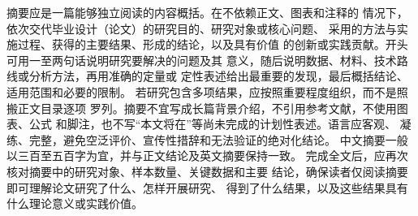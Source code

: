 \documentclass{swutthesis}
\begin{document}
\maketitle
\makecopyrightstatements

\begin{cnabstract}
摘要应是一篇能够独立阅读的内容概括。在不依赖正文、图表和注释的
情况下，依次交代毕业设计（论文）的研究目的、研究对象或核心问题、
采用的方法与实施过程、获得的主要结果、形成的结论，以及具有价值
的创新或实践贡献。开头可用一至两句话说明研究要解决的问题及其
意义，随后说明数据、材料、技术路线或分析方法，再用准确的定量或
定性表述给出最重要的发现，最后概括结论、适用范围和必要的限制。
若研究包含多项结果，应按照重要程度组织，而不是照搬正文目录逐项
罗列。摘要不宜写成长篇背景介绍，不引用参考文献，不使用图表、公式
和脚注，也不写“本文将在”等尚未完成的计划性表述。语言应客观、
凝练、完整，避免空泛评价、宣传性措辞和无法验证的绝对化结论。
中文摘要一般以三百至五百字为宜，并与正文结论及英文摘要保持一致。
完成全文后，应再次核对摘要中的研究对象、样本数量、关键数据和主要
结论，确保读者仅阅读摘要即可理解论文研究了什么、怎样开展研究、
得到了什么结果，以及这些结果具有什么理论意义或实践价值。
\end{cnabstract}
\end{document}
